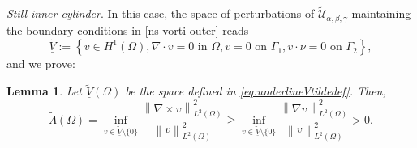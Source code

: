 \documentclass[a4paper,11pt]{amsart}
\newtheorem{lemma}{Lemma}[section]
\numberwithin{equation}{section}
\numberwithin{figure}{section}
\newcommand{\norm}[1]{\left \lVert #1 \right \rVert}
\begin{document}
\underline{\emph{Still inner cylinder}}. In this case, the space of perturbations of $\widetilde{\mathcal{U}}_{\alpha,\beta,\gamma}$ maintaining the boundary conditions in \eqref{ns-vorti-outer} reads
\begin{equation}\label{eq:underlineVtildedef} 
	\underline{\widetilde V}:= \left\{v\in H^1(\Omega), \nabla\cdot v=0 \text{ in } \Omega,  v=0 \text{ on } \Gamma_1, v\cdot \nu=0  \text{ on } \Gamma_2\right\},
\end{equation}and we prove:
\begin{lemma}\label{lem:poincarecurlouter}
	Let $\underline{\widetilde V}(\Omega)$ be the space defined in \eqref{eq:underlineVtildedef}. Then,
	\begin{equation}\label{eq:poincarecurl}
		\widetilde{\underline{\Lambda}}(\Omega)=\inf_{v\in \widetilde{\underline{V}}\setminus\{ 0\} }\frac{\norm{\nabla\times v}_{L^2(\Omega)}^2}{\norm{v}_{L^2(\Omega)}^2}\geq \inf_{v\in \widetilde{\underline{V}}\setminus\{ 0\} }\frac{\norm{\nabla v}_{L^2(\Omega)}^2}{\norm{v}_{L^2(\Omega)}^2}>0.
	\end{equation}
\end{lemma}
\end{document}
